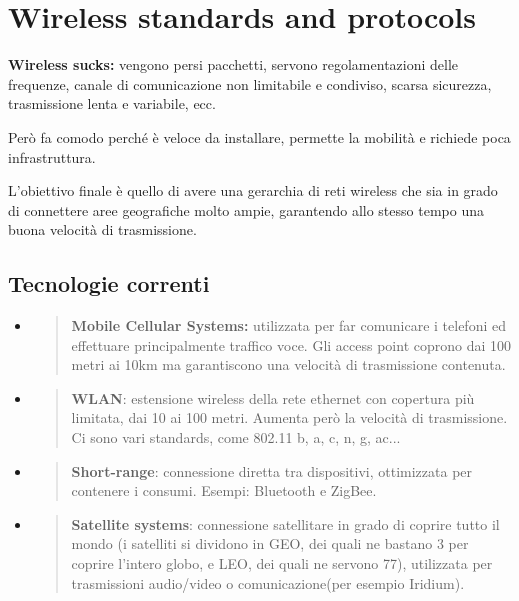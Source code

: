 \section{Wireless standards and
protocols}\label{wireless-standards-and-protocols}

\textbf{Wireless sucks:} vengono persi pacchetti, servono
regolamentazioni delle frequenze, canale di comunicazione non limitabile
e condiviso, scarsa sicurezza, trasmissione lenta e variabile, ecc.

Però fa comodo perché è veloce da installare, permette la mobilità e richiede 
poca infrastruttura.

L'obiettivo finale è quello di avere una gerarchia di reti wireless che sia in
grado di connettere aree geografiche molto ampie, garantendo allo stesso
tempo una buona velocità di trasmissione.

\subsection{Tecnologie correnti}\label{tecnologie-correnti}

\begin{itemize}
\item
  \begin{quote}
  \textbf{Mobile Cellular Systems:} utilizzata per far comunicare i
  telefoni ed effettuare principalmente traffico voce. Gli access point
  coprono dai 100 metri ai 10km ma garantiscono una velocità di
  trasmissione contenuta.
  \end{quote}
\item
  \begin{quote}
  \textbf{WLAN}: estensione wireless della rete ethernet con copertura
  più limitata, dai 10 ai 100 metri. Aumenta però la velocità di
  trasmissione. Ci sono vari standards, come 802.11 b, a, c, n, g, ac...
  \end{quote}
\item
  \begin{quote}
  \textbf{Short-range}: connessione diretta tra dispositivi, ottimizzata
  per contenere i consumi. Esempi: Bluetooth e ZigBee.
  \end{quote}
\item
  \begin{quote}
  \textbf{Satellite systems}: connessione satellitare in grado di
  coprire tutto il mondo (i satelliti si dividono in GEO, dei quali ne bastano 3
  per coprire l'intero globo, e LEO, dei quali ne servono 77), utilizzata per 
  trasmissioni audio/video o comunicazione(per esempio Iridium).
  \end{quote}
\end{itemize}

